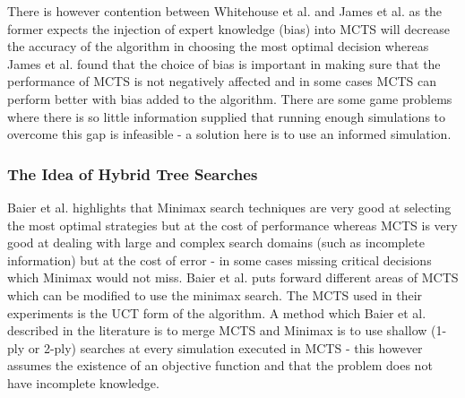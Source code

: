 \documentclass [11pt]{article}
\begin{document}
	\noindent There is however contention between Whitehouse et al. \cite{knowledge} and James et al. \cite{wits} as the former expects the injection of expert knowledge (bias) into MCTS will decrease the accuracy of the algorithm in choosing the most optimal decision whereas James et al. \cite{wits} found that the choice of bias is important in making sure that the performance of MCTS is not negatively affected and in some cases MCTS can perform better with bias added to the algorithm. There are some game problems where there is so little information supplied that running enough simulations to overcome this gap is infeasible - a solution here is to use an informed simulation. 
	
	\subsubsection{The Idea of Hybrid Tree Searches}
	Baier et al. \cite{hybrids} highlights that Minimax search techniques are very good at selecting the most optimal strategies but at the cost of performance whereas MCTS is very good at dealing with large and complex search domains (such as incomplete information) but at the cost of error - in some cases missing critical decisions which Minimax would not miss. Baier et al. \cite{hybrids} puts forward different areas of MCTS which can be modified to use the minimax search. The MCTS used in their experiments is the UCT form of the algorithm. A method which Baier et al. \cite{hybrids} described in the literature is to merge MCTS and Minimax is to use shallow (1-ply or 2-ply) searches at every simulation executed in MCTS - this however assumes the existence of an objective function and that the problem does not have incomplete knowledge.\\
	
\end{document}
